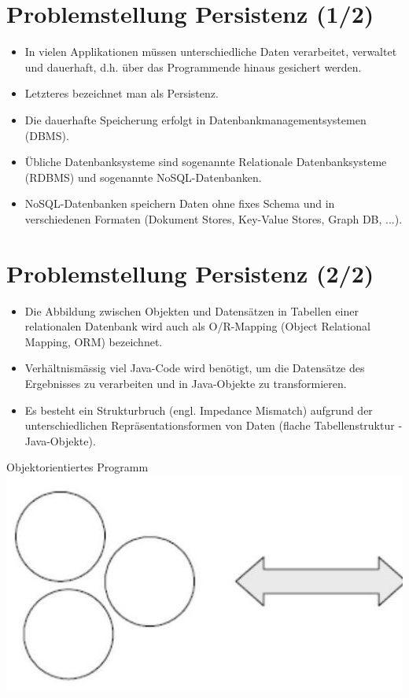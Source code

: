 \documentclass[10pt]{article}
\begin{document}
\section*{Problemstellung Persistenz (1/2)}
\begin{itemize}
  \item In vielen Applikationen müssen unterschiedliche Daten verarbeitet, verwaltet und dauerhaft, d.h. über das Programmende hinaus gesichert werden.
  \item Letzteres bezeichnet man als Persistenz.
  \item Die dauerhafte Speicherung erfolgt in Datenbankmanagementsystemen (DBMS).
  \item Übliche Datenbanksysteme sind sogenannte Relationale Datenbanksysteme (RDBMS) und sogenannte NoSQL-Datenbanken.
  \item NoSQL-Datenbanken speichern Daten ohne fixes Schema und in verschiedenen Formaten (Dokument Stores, Key-Value Stores, Graph DB, ...).
\end{itemize}

\section*{Problemstellung Persistenz (2/2)}
\begin{itemize}
  \item Die Abbildung zwischen Objekten und Datensätzen in Tabellen einer relationalen Datenbank wird auch als O/R-Mapping (Object Relational Mapping, ORM) bezeichnet.
  \item Verhältnismässig viel Java-Code wird benötigt, um die Datensätze des Ergebnisses zu verarbeiten und in Java-Objekte zu transformieren.
  \item Es besteht ein Strukturbruch (engl. Impedance Mismatch) aufgrund der unterschiedlichen Repräsentationsformen von Daten (flache Tabellenstruktur -Java-Objekte).
\end{itemize}

Objektorientiertes Programm\\
\includegraphics[width=\linewidth]{images/2025_01_02_5ba1dc702e9f94ba8e06g-06}
\end{document}

